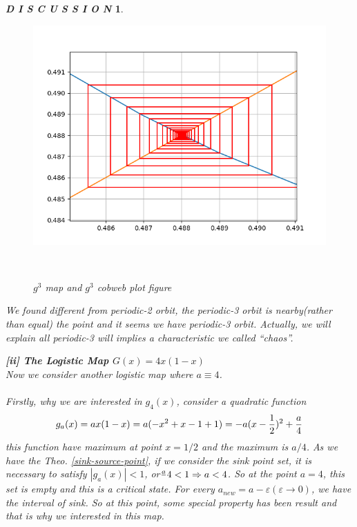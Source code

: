 \documentclass[12pt]{article}
\theoremstyle{plain}
\newtheorem{discussion}{\textit{D I S C U S S I O N}}[section]
\begin{document}
\begin{discussion}
\begin{figure}[H]
\begin{minipage}[c][0.33\width]{0.33\textwidth}
   \includegraphics[width=\textwidth]{figure/section1/g3logistic384-001-detail.png} 
\end{minipage}
\\[3ex]\caption{$g^3$ map and $g^3$ cobweb plot figure}\label{logistic-cobweb-plot1}
\end{figure}

We found different from periodic-2 orbit, the periodic-3 orbit is nearby(rather than equal) the point and it seems we have periodic-3 orbit. Actually, we will explain all periodic-3 will implies a characteristic we called ``chaos''. 






\newpage
  \noindent \textbf{[ii] The Logistic Map $G(x) = 4x(1-x)$}
\\\noindent Now we consider another logistic map where $a \equiv 4$. \\[1ex]
\\\noindent Firstly, why we are interested in $g_4(x)$, consider a quadratic function 
$$
g_a(x) = ax(1-x) = a(-x^2 + x - 1 + 1) = -a(x-{1\over 2})^2 +{a\over 4}
$$
this function have maximum at point $x = 1/2$ and the maximum is $a/4$. As we have the Theo. \ref{sink-source-point}, if we consider the sink point set, it is necessary to satisfy $|g_a(x)| < 1$, or${a \over } 4 < 1 \Rightarrow a < 4$. So at the point $a = 4$, this set is empty and this is a critical state. For every $a_{new} = a - \varepsilon (\varepsilon \rightarrow 0)$, we have the interval of sink. So at this point, some special property has been result and that is why we interested in this map.


\end{discussion}
\end{document}
